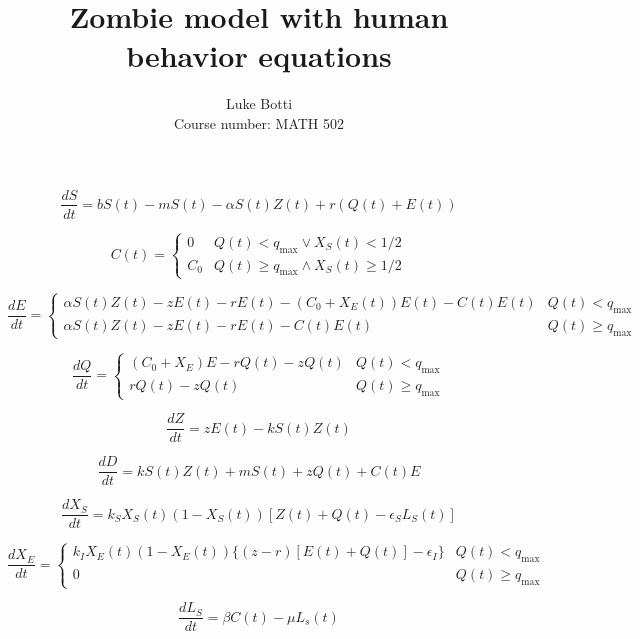 \documentclass[12pt]{article}
\begin{document}
 
\title{Zombie model with human behavior equations}
\author{Luke Botti\\
Course number: MATH 502}
\maketitle
 
$$\frac{dS}{dt} = bS(t) - mS(t) -\alpha S(t)Z(t) + r(Q(t)+E(t))$$

$$C(t) = \begin{cases}
	0 & Q(t) < q_{\text{max}} \vee X_S(t) < 1/2 \\
	C_0 & Q(t) \geq q_{\text{max}} \wedge X_S(t) \geq 1/2
\end{cases}$$

$$\frac{dE}{dt} = \begin{cases} 
      \alpha S(t)Z(t) - zE(t) -rE(t) - (C_0 + X_E(t))E(t) - C(t) E(t) & Q(t) < q_{\text{max}} \\
      \alpha S(t)Z(t) - zE(t) -rE(t) - C(t) E(t) & Q(t) \geq q_{\text{max}}
   \end{cases}
$$

$$\frac{dQ}{dt} = \begin{cases}
	(C_0 + X_E)E - rQ(t) - zQ(t) & Q(t) < q_{\text{max}}\\
	rQ(t) - zQ(t) & Q(t) \geq q_{\text{max}}
\end{cases}$$

$$\frac{dZ}{dt} = zE(t) -kS(t)Z(t)$$

$$\frac{dD}{dt} = kS(t)Z(t) + mS(t) + zQ(t) + C(t)E$$

$$\frac{dX_S}{dt} = k_S X_S(t) (1 - X_S(t))[Z(t) + Q(t) - \epsilon_S L_S(t)]$$

$$\frac{dX_E}{dt} = \begin{cases}
	k_I X_E(t) (1 - X_E(t))\{(z-r)[E(t) + Q(t)] - \epsilon_I\} & Q(t) < q_{\text{max}} \\
	0 & Q(t) \geq q_{\text{max}}
\end{cases}$$

$$\frac{dL_S}{dt} = \beta C(t) - \mu L_s(t)$$
\end{document}
